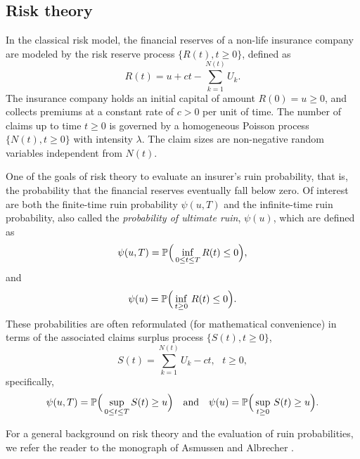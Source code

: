 \subsection{Risk theory}
In the classical risk model, the financial reserves of a non-life insurance company are modeled by the risk reserve process $\{R(t),t\geq0\}$, defined as
\begin{equation*}\label{eq:RiskReserveProcess}
R(t)=u+ct-\sum_{k=1}^{N(t)}U_k.
\end{equation*}
The insurance company holds an initial capital of amount $R(0)=u\geq0$, and collects premiums at a constant rate of $c>0$ per unit of time. The number of claims up to time $t\geq0$ is governed by a homogeneous Poisson process $\{N(t),t\geq0\}$ with intensity $\lambda$. The claim sizes are \iid non-negative random variables independent from $N(t)$.

One of the goals of risk theory to evaluate an insurer's ruin probability, that is, the probability that the financial reserves eventually fall below zero. Of interest are both the finite-time ruin probability $\psi(u,T)$ and the infinite-time ruin probability, also called the \emph{probability of ultimate ruin}, $\psi(u)$, which are defined as
\begin{equation*}\label{eq:FiniteTimeRuinProbability}
\psi(u,T)=\P\Big( \inf_{0 \le t \le T} R(t) \leq 0 \Big),
\end{equation*}
and
\begin{equation*}\label{eq:InfiniteTimeRuinProbability}
\psi(u)=\P\Big( \inf_{t \geq 0}\,R(t) \leq 0 \Big).
\end{equation*}
These probabilities are often reformulated (for mathematical convenience) in terms of the associated claims surplus process $\{S(t),t\geq0\}$,
\begin{equation*} \label{eq:ClaimsSurplusProcess}
S(t) = \sum_{k=1}^{N(t)} U_k - ct,\text{ }t\geq0,
\end{equation*}
specifically,
\begin{equation*}
\psi(u,T)=\P\Big( \sup_{0 \le t \le T} S(t) \geq u \Big) \quad \text{and} \quad
\psi(u)=\P\Big( \sup_{t \geq 0}\,S(t) \geq u \Big).
\end{equation*}

For a general background on risk theory and the evaluation of ruin probabilities, we refer the reader to the monograph of Asmussen and Albrecher \cite{asmussen2010ruin}.

